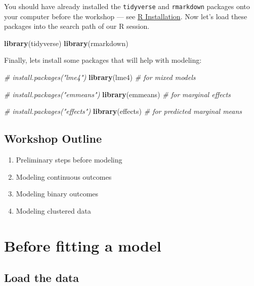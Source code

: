 \documentclass[]{book}
\newenvironment{Shaded}{\begin{snugshade}}{\end{snugshade}}
\newcommand{\KeywordTok}[1]{\textcolor[rgb]{0.13,0.29,0.53}{\textbf{#1}}}
\newcommand{\CommentTok}[1]{\textcolor[rgb]{0.56,0.35,0.01}{\textit{#1}}}
\newcommand{\NormalTok}[1]{#1}
\providecommand{\tightlist}{%
  \setlength{\itemsep}{0pt}\setlength{\parskip}{0pt}}
\begin{document}
You should have already installed the \texttt{tidyverse} and
\texttt{rmarkdown} packages onto your computer before the workshop ---
see \href{./Rinstall.html}{R Installation}. Now let's load these
packages into the search path of our R session.

\begin{Shaded}
\begin{Highlighting}[]
\KeywordTok{library}\NormalTok{(tidyverse)}
\KeywordTok{library}\NormalTok{(rmarkdown)}
\end{Highlighting}
\end{Shaded}

Finally, lets install some packages that will help with modeling:

\begin{Shaded}
\begin{Highlighting}[]
\CommentTok{# install.packages("lme4")}
\KeywordTok{library}\NormalTok{(lme4)  }\CommentTok{# for mixed models}

\CommentTok{# install.packages("emmeans")}
\KeywordTok{library}\NormalTok{(emmeans)  }\CommentTok{# for marginal effects}

\CommentTok{# install.packages("effects")}
\KeywordTok{library}\NormalTok{(effects)  }\CommentTok{# for predicted marginal means}
\end{Highlighting}
\end{Shaded}

\subsection{Workshop Outline}\label{workshop-outline}

\begin{enumerate}
\def\labelenumi{\arabic{enumi}.}
\tightlist
\item
  Preliminary steps before modeling
\item
  Modeling continuous outcomes
\item
  Modeling binary outcomes
\item
  Modeling clustered data
\end{enumerate}

\section{Before fitting a model}\label{before-fitting-a-model}

\subsection{Load the data}\label{load-the-data}
\end{document}
